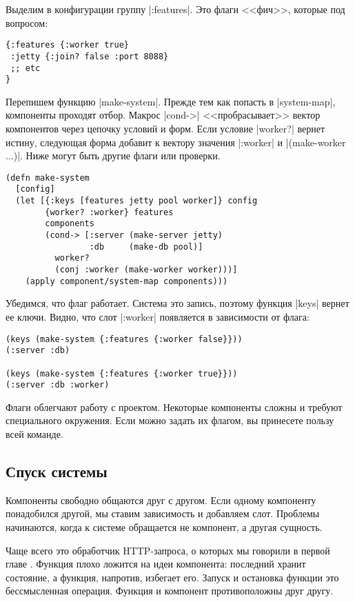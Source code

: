 Выделим в конфигурации группу \spverb|:features|. Это флаги <<фич>>, которые под
вопросом:

\begin{verbatim}
{:features {:worker true}
 :jetty {:join? false :port 8088}
 ;; etc
}
\end{verbatim}

Перепишем функцию \spverb|make-system|. Прежде тем как попасть в
\spverb|system-map|, компоненты проходят отбор. Макрос \spverb|cond->|
<<пробрасывает>> вектор компонентов через цепочку условий и форм. Если условие
\spverb|worker?| вернет истину, следующая форма добавит к вектору значения
\spverb|:worker| и \spverb|(make-worker {...})|. Ниже могут быть другие флаги
или проверки.


\begin{verbatim}
(defn make-system
  [config]
  (let [{:keys [features jetty pool worker]} config
        {worker? :worker} features
        components
        (cond-> [:server (make-server jetty)
                 :db     (make-db pool)]
          worker?
          (conj :worker (make-worker worker)))]
    (apply component/system-map components)))
\end{verbatim}

Убедимся, что флаг работает. Система это запись, поэтому функция \spverb|keys|
вернет ее ключи. Видно, что слот \spverb|:worker| появляется в зависимости от
флага:

\begin{verbatim}
(keys (make-system {:features {:worker false}}))
(:server :db)

(keys (make-system {:features {:worker true}}))
(:server :db :worker)
\end{verbatim}

Флаги облегчают работу с проектом. Некоторые компоненты сложны и требуют
специального окружения. Если можно задать их флагом, вы принесете пользу всей
команде.

\subsection{Спуск системы}

Компоненты свободно общаются друг с другом. Если одному компоненту понадобился
другой, мы ставим зависимость и добавляем слот. Проблемы начинаются, когда к
системе обращается не компонент, а другая сущность.

Чаще всего это обработчик HTTP-запроса, о которых мы говорили в первой
главе . Функция плохо ложится на идеи компонента: последний
хранит состояние, а функция, напротив, избегает его. Запуск и остановка функции
это бессмысленная операция. Функция и компонент противоположны друг другу.


